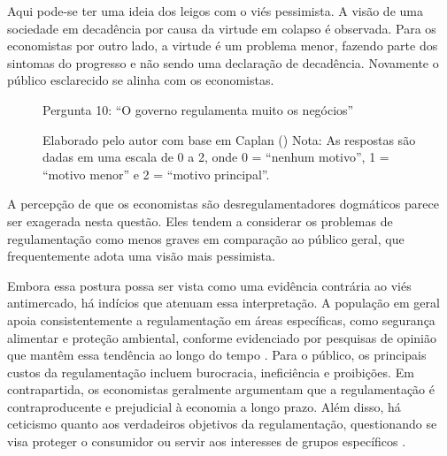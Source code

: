 Aqui pode-se ter uma ideia dos leigos com o viés pessimista. A visão de uma sociedade em decadência por causa da virtude em colapso é observada. Para os economistas por outro lado, a virtude é um problema menor, fazendo parte dos sintomas do progresso e não sendo uma declaração de decadência. Novamente o público esclarecido se alinha com os economistas. 













\begin{figure}[H]
    \centering
    \caption*{Pergunta 10: “O governo regulamenta muito os negócios”}
    \caption{Elaborado pelo autor com base em Caplan (\citeyear{The_Myth_of_the_Rational_Voter}) \newline
    Nota: As respostas são dadas em uma escala de 0 a 2, onde 0 = “nenhum motivo”, 1 = “motivo menor” e 2 = “motivo principal”.}
    \label{fig:pergunta_10}
\end{figure}

A percepção de que os economistas são desregulamentadores dogmáticos parece ser exagerada nesta questão. Eles tendem a considerar os problemas de regulamentação como menos graves em comparação ao público geral, que frequentemente adota uma visão mais pessimista.

Embora essa postura possa ser vista como uma evidência contrária ao viés antimercado, há indícios que atenuam essa interpretação. A população em geral apoia consistentemente a regulamentação em áreas específicas, como segurança alimentar e proteção ambiental, conforme evidenciado por pesquisas de opinião que mantêm essa tendência ao longo do tempo \cite{pew_research_2023}. Para o público, os principais custos da regulamentação incluem burocracia, ineficiência e proibições. Em contrapartida, os economistas geralmente argumentam que a regulamentação é contraproducente e prejudicial à economia a longo prazo. Além disso, há ceticismo quanto aos verdadeiros objetivos da regulamentação, questionando se visa proteger o consumidor ou servir aos interesses de grupos específicos \cite{rowley1988political, weiss1986regulatory,The_Myth_of_the_Rational_Voter}.







